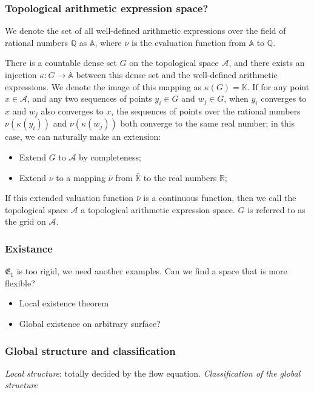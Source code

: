 \documentclass[aspectratio=169]{beamer}
\begin{document}
\begin{frame}
    \frametitle{Topological arithmetic expression space?}
    We denote the set of all well-defined arithmetic expressions over the field of rational numbers $\mathbb{Q}$ as $\mathbb{A}$, where $\nu$ is the evaluation function from $\mathbb{A}$ to $\mathbb{Q}$.
    \begin{definition}
        There is a countable dense set $G$ on the topological space $\mathcal{A}$, and there exists an injection $\kappa: G \to \mathbb{A}$ between this dense set and the well-defined arithmetic expressions.
        We denote the image of this mapping as $\kappa(G) = \mathbb{K}$. If for any point $x \in \mathcal{A}$,
        and any two sequences of points $y_i \in G$ and $w_j \in G$, when $y_i$ converges to $x$ and $w_j$ also converges to $x$,
        the sequences of points over the rational numbers $\nu(\kappa(y_i))$ and $\nu(\kappa(w_j))$ both converge to the same real number; in this case, we can naturally make an extension:
        \begin{itemize}
            \item Extend $G$ to $\mathcal{A}$ by completeness;
            \item Extend $\nu$ to a mapping $\bar{\nu}$ from $\bar{\mathbb{K}}$ to the real numbers $\mathbb{R}$;
        \end{itemize}
        If this extended valuation function $\bar{\nu}$ is a continuous function, then we call the topological space $\mathcal{A}$ a topological arithmetic expression space. $G$ is referred to as the grid on $\mathcal{A}$.
    \end{definition}
\end{frame}

\begin{frame}
    \frametitle{Existance}
    $\mathfrak{E_1}$ is too rigid, we need another examples. Can we find a space that is more flexible?
    \begin{itemize}
        \item Local existence theorem
        \item Global existence on arbitrary surface?
    \end{itemize}
\end{frame}

\begin{frame}
    \frametitle{Global structure and classification}

\emph{Local structure}: totally decided by the flow equation.
\emph{Classification of the global structure}

\end{frame}
\end{document}
